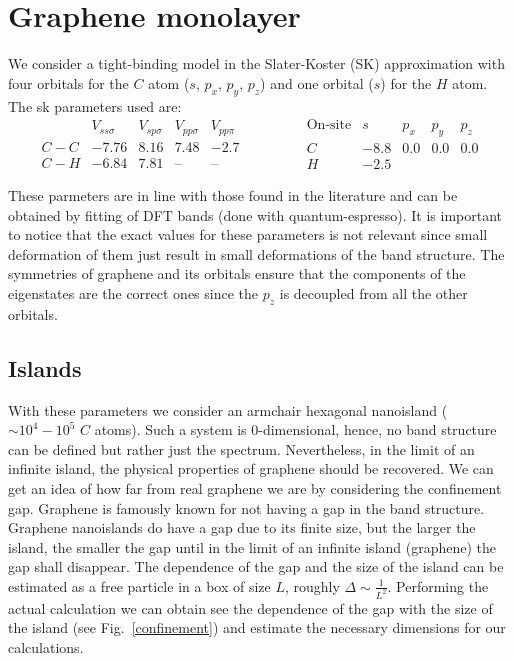 \chapter{Graphene monolayer}
We consider a tight-binding model in the Slater-Koster (SK) approximation with four orbitals for the $C$ atom ($s$, $p_x$, $p_y$, $p_z$) and one orbital ($s$) for the $H$ atom. The \ac{sk} parameters used are:
\begin{equation}
  \begin{array}{l|cccc}
        & V_{ss\sigma} & V_{sp\sigma} & V_{pp\sigma} & V_{pp\pi} \\ \hline
    C-C & -7.76 & 8.16 & 7.48 & -2.7 \\
    C-H & -6.84 & 7.81 & \text{--} & \text{--}
  \end{array}\qquad\qquad
  \begin{array}{c|cccc}
    \text{On-site} & s & p_x & p_y & p_z \\ \hline
    C & -8.8 & 0.0 & 0.0 & 0.0 \\
    H & -2.5 &     &     &
  \end{array}
\label{SK_params}
\end{equation}

These parmeters are in line with those found in the literature\cite{Gosalbez-Martinez2011,Konschuh2010,Saito1998} and can be obtained by fitting of DFT bands (done with quantum-espresso). It is important to notice that the exact values for these parameters is not relevant since small deformation of them just result in small deformations of the band structure. The symmetries of graphene and its orbitals ensure that the components of the eigenstates are the correct ones since the $p_z$ is decoupled from all the other orbitals.

\section{Islands}
With these parameters we consider an armchair hexagonal nanoisland ($\sim10^4-10^5$ $C$ atoms). Such a system is 0-dimensional, hence, no band structure can be defined but rather just the spectrum. Nevertheless, in the limit of an infinite island, the physical properties of graphene should be recovered.
We can get an idea of how far from real graphene we are by considering the confinement gap. Graphene is famously known for not having a gap in the band structure. Graphene nanoislands do have a gap due to its finite size, but the larger the island, the smaller the gap until in the limit of an infinite island (graphene) the gap shall disappear. The dependence of the gap and the size of the island can be estimated as a free particle in a box of size $L$, roughly $\Delta\sim\frac{1}{L^2}$. Performing the actual calculation we can obtain see the dependence of the gap with the size of the island (see Fig.~\ref{confinement}) and estimate the necessary dimensions for our calculations.

